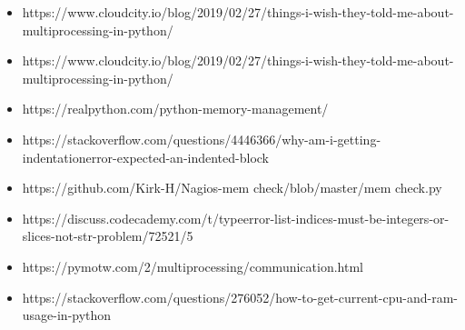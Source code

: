 \documentclass[onecolumn]{article}
\begin{document}
\begin{itemize}
\item https://www.cloudcity.io/blog/2019/02/27/things-i-wish-they-told-me-about-multiprocessing-in-python/
\item https://www.cloudcity.io/blog/2019/02/27/things-i-wish-they-told-me-about-multiprocessing-in-python/
\item https://realpython.com/python-memory-management/
\item https://stackoverflow.com/questions/4446366/why-am-i-getting-indentationerror-expected-an-indented-block
\item https://github.com/Kirk-H/Nagios-mem check/blob/master/mem check.py
\item https://discuss.codecademy.com/t/typeerror-list-indices-must-be-integers-or-slices-not-str-problem/72521/5
\item https://pymotw.com/2/multiprocessing/communication.html
\item https://stackoverflow.com/questions/276052/how-to-get-current-cpu-and-ram-usage-in-python
\end{itemize}






\nocite{*}


\end{document}

